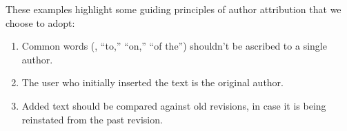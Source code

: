 These examples highlight some guiding principles of author attribution that
we choose to adopt:
\begin{enumerate}
\item Common words (\eg, ``to,'' ``on,'' ``of the'') shouldn't be
    ascribed to a single author.
\item The user who initially inserted the text is the original author.
\item Added text should be compared against old revisions, in case it is
being reinstated from the past revision.
\end{enumerate}


